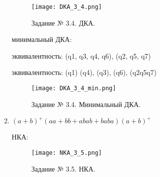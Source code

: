 \documentclass[a4paper, 12pt]{article}
\begin{document}
\begin{enumerate}
\begin{figure}[h!]
\centering
\texttt{[image: DKA\_3\_4.png]}
\caption{Задание № 3.4. ДКА.}
\end{figure}

 минимальный ДКА:

 эквивалентность: (q1, q3, q4, q6), (q2, q5, q7)

 эквивалентность: (q1) (q4), (q3), (q6), (q2q5q7)

\begin{figure}[h!]
\centering
\texttt{[image: DKA\_3\_4\_min.png]}
\caption{Задание № 3.4. Минимальный ДКА.}
\end{figure}

\newpage

\item$ (a+b)^+(aa+bb+abab+baba)(a+b)^+ $ 

 НКА:

\begin{figure}[h!]
\centering
\texttt{[image: NKA\_3\_5.png]}
\caption{Задание № 3.5. НКА.}
\end{figure}


\end{enumerate}
\end{document}
